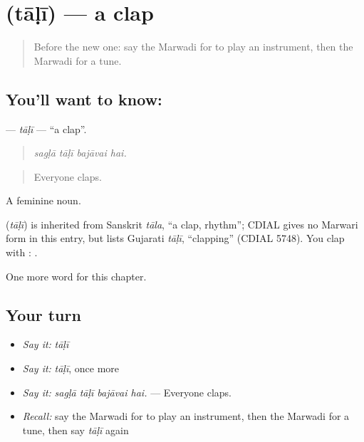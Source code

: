 \section[\texorpdfstring{\mw{ताळी} (tāḷī)}{ताळी (tāḷī)}]{ (tāḷī) — a clap}

\label{lesson:MW-C276-tali}



\begin{quote}
Before the new one: say the Marwadi for to play an instrument, then the Marwadi for a tune.
\end{quote}

\subsection*{You'll want to know: }
\textbf{} — \emph{tāḷī} — \textquotedblleft{}a clap\textquotedblright{}.

\begin{quote}
   
\end{quote}

\begin{quote}
\emph{sagḷā tāḷī bajāvai hai.}
\end{quote}

\begin{quote}
Everyone claps.
\end{quote}

A feminine noun.

\begin{cousinweb}
\textbf{} (\emph{tāḷī}) is inherited from Sanskrit \emph{tāla}, \textquotedblleft{}a clap, rhythm\textquotedblright{}; CDIAL gives no Marwari form in this entry, but lists Gujarati \emph{tāḷī}, \textquotedblleft{}clapping\textquotedblright{} (CDIAL 5748). You clap with \textbf{}: \textbf{ }.
\end{cousinweb}

\begin{grammarlens}[title={What you've built}]
One more word for this chapter.
\end{grammarlens}

\subsection*{Your turn}
\begin{itemize}
\raggedright
  \item \emph{Say it:} \emph{tāḷī}
  \item \emph{Say it:} \emph{tāḷī}, once more
  \item \emph{Say it:} \emph{sagḷā tāḷī bajāvai hai.} — Everyone claps.
  \item \emph{Recall:} say the Marwadi for to play an instrument, then the Marwadi for a tune, then say \emph{tāḷī} again
\end{itemize}

